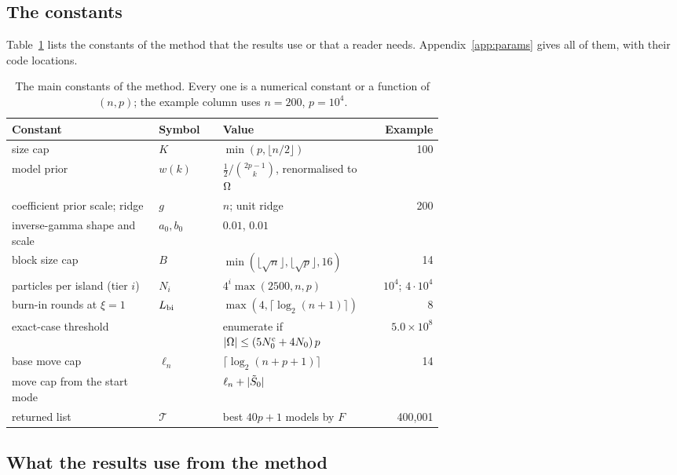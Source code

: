 \subsection{The constants}\label{sec:constants}

Table~\ref{tab:params} lists the constants of the method that the results use or that a reader needs. Appendix~\ref{app:params}
gives all of them, with their code locations.

\begin{table}[ht]
\centering\small
\setlength{\tabcolsep}{4pt}
\caption{The main constants of the method. Every one is a numerical constant or a function of $(n,p)$; the example
column uses $n=200$, $p=10^4$.}\label{tab:params}
\begin{tabular}{@{}>{\raggedright\arraybackslash}p{0.34\linewidth}l>{\raggedright\arraybackslash}p{0.3\linewidth}r@{}}
\toprule
Constant & Symbol & Value & Example \\
\midrule
size cap & $K$ & $\min(p,\lfloor n/2\rfloor)$ & 100 \\
model prior & $w(k)$ & $\tfrac12/\binom{2p-1}{k}$, renormalised to $\Omega$ & \\
coefficient prior scale; ridge & $g$ & $n$; unit ridge & 200 \\
inverse-gamma shape and scale & $a_0,b_0$ & $0.01$, $0.01$ & \\
block size cap & $B$ & $\min(\lfloor\sqrt n\rfloor,\lfloor\sqrt p\rfloor,16)$ & 14 \\
particles per island (tier $i$) & $N_i$ & $4^i\max(2500,n,p)$ & $10^4$; $4\cdot10^4$ \\
burn-in rounds at $\xi=1$ & $L_{\mathrm{bi}}$ & $\max(4,\lceil\log_2(n+1)\rceil)$ & 8 \\
exact-case threshold & & enumerate if $\lvert \Omega\rvert\le(5N^{\mathrm c}_0+4N_0)\,p$ & $5.0\times10^8$ \\
base move cap & $\ell_n$ & $\lceil\log_2(n+p+1)\rceil$ & 14 \\
move cap from the start mode & & $\ell_n+\lvert \tilde S_0\rvert$ & \\
returned list & $\mathcal T$ & best $40p+1$ models by $F$ & 400,001 \\
\bottomrule
\end{tabular}
\end{table}

\subsection{What the results use from the method}\label{sec:conventions}

